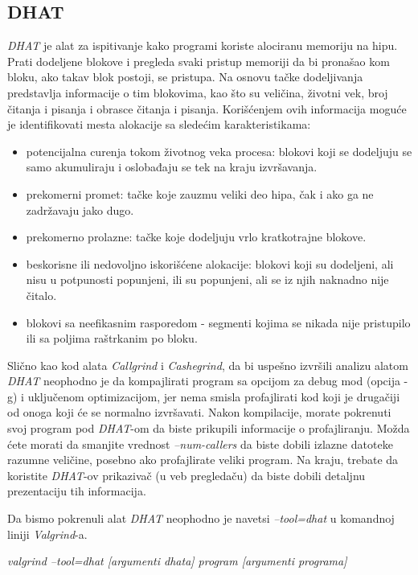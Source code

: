 \documentclass[12pt,oneside]{memoir}
\theoremstyle{plain}
\theoremstyle{definition}
\begin{document}
\subsection{DHAT}
\textit{DHAT} je alat za ispitivanje kako programi koriste alociranu memoriju na hipu. Prati dodeljene blokove i pregleda svaki pristup memoriji da bi pronašao kom bloku, ako takav blok postoji, se pristupa. Na osnovu tačke dodeljivanja predstavlja informacije o tim blokovima, kao što su veličina, životni vek, broj čitanja i pisanja i obrasce čitanja i pisanja. Korišćenjem ovih informacija moguće je identifikovati mesta alokacije sa sledećim karakteristikama:
\begin{itemize}
\item potencijalna curenja tokom životnog veka procesa: blokovi koji se dodeljuju se samo akumuliraju i oslobađaju se tek na kraju izvršavanja.
\item prekomerni promet: tačke koje zauzmu veliki deo hipa, čak i ako ga ne zadržavaju jako dugo.
\item prekomerno prolazne: tačke koje dodeljuju vrlo kratkotrajne blokove.
\item beskorisne ili nedovoljno iskorišćene alokacije: blokovi koji su dodeljeni, ali nisu u potpunosti popunjeni, ili su popunjeni, ali se iz njih naknadno nije čitalo.
\item blokovi sa neefikasnim rasporedom - segmenti kojima se nikada nije pristupilo ili sa poljima raštrkanim po bloku.
\end{itemize}

Slično kao kod alata \textit{Callgrind} i \textit{Cashegrind}, da bi uspešno izvršili analizu alatom \textit{DHAT} neophodno je da kompajlirati program sa opcijom za debug mod (opcija -g) i uključenom optimizacijom, jer nema smisla profajlirati kod koji je drugačiji od onoga koji će se normalno izvršavati. Nakon kompilacije, morate pokrenuti svoj program pod \textit{DHAT}-om da biste prikupili informacije o profajliranju. Možda ćete morati da smanjite vrednost \textit{--num-callers} da biste dobili izlazne datoteke razumne veličine, posebno ako profajlirate veliki program. Na kraju, trebate da koristite\textit{ DHAT}-ov prikazivač (u veb pregledaču) da biste dobili detaljnu prezentaciju tih informacija.

Da bismo pokrenuli alat \textit{ DHAT} neophodno je navetsi \textit{–tool=dhat} u komandnoj liniji \textit{Valgrind}-a.
\begin{center}
\textit{valgrind --tool=dhat [argumenti dhata] program [argumenti programa]}
\end{center}
\end{document}
